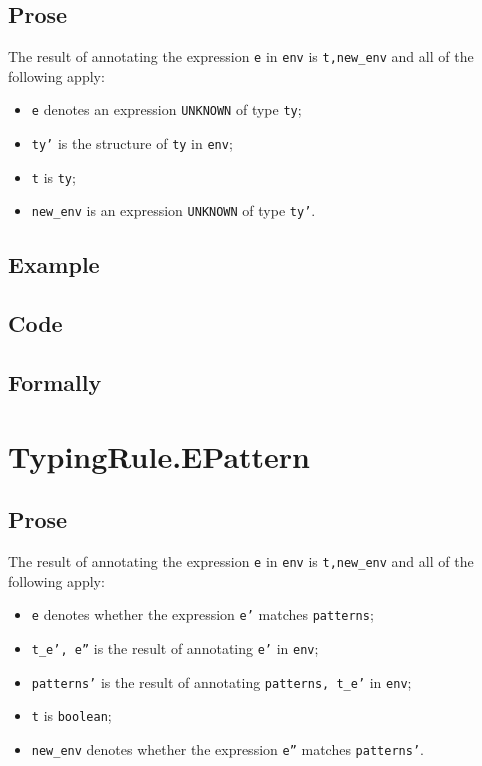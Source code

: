 \documentclass{book}
\begin{document}
  \subsection{Prose}
  The result of annotating the expression \texttt{e} in \texttt{env} is
\texttt{t,new\_env} and all of the following apply:
  \begin{itemize}
  \item \texttt{e} denotes an expression \texttt{UNKNOWN} of type \texttt{ty};
  \item \texttt{ty'} is the structure of \texttt{ty} in \texttt{env};
  \item \texttt{t} is \texttt{ty};
  \item \texttt{new\_env} is an expression \texttt{UNKNOWN} of type \texttt{ty'}.
  \end{itemize}

  \subsection{Example}

  \subsection{Code}

\begin{emptyformal}
    \subsection{Formally}
\end{emptyformal}


\section{TypingRule.EPattern \label{sec:TypingRule.EPattern}}

  \subsection{Prose}
  The result of annotating the expression \texttt{e} in \texttt{env} is
\texttt{t,new\_env} and all of the following apply:
  \begin{itemize}
  \item \texttt{e} denotes whether the expression \texttt{e'} matches \texttt{patterns};
  \item \texttt{t\_e', e''} is the result of annotating \texttt{e'} in \texttt{env};
  \item \texttt{patterns'} is the result of annotating \texttt{patterns, t\_e'} in \texttt{env};
  \item \texttt{t} is \texttt{boolean};
  \item \texttt{new\_env} denotes whether the expression \texttt{e''} matches \texttt{patterns'}.
  \end{itemize}
\end{document}
